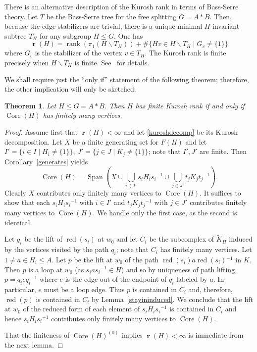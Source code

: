 \documentclass[11pt,reqno]{amsart}
\newtheorem{Thm}{Theorem}
\begin{document}
There is an alternative description of the Kurosh rank in terms of Bass-Serre theory.  Let $T$ be the Bass-Serre tree for the free splitting $G=A\ast B$.  Then, because the edge stabilizers are trivial, there is a unique minimal $H$-invariant subtree $T_H$ for any subgroup $H\leq G$.  One has \[{\mathop{\boldsymbol{r}}}(H)={\mathop{\mathrm{rank}}}(\pi_1(H\backslash T_H))+\#\{Hv\in H\backslash T_H\mid G_v\neq \{1\}\}\] where $G_v$ is the stabilizer of the vertex $v\in T_H$.  The Kurosh rank is finite precisely when $H\backslash T_H$ is finite.  See~\cite{sykiotis} for details.

We shall require just the ``only if'' statement of the following theorem; therefore, the other implication will only be sketched.

\begin{Thm}\label{finitecore}
Let $H\leq G=A\ast B$.  Then $H$ has finite Kurosh rank if and only if ${\mathop{\mathrm{Core}}\nolimits}(H)$ has finitely many vertices.
\end{Thm}
\begin{proof}
Assume first that ${\mathop{\boldsymbol{r}}}(H)<\infty$ and let \eqref{kuroshdecomp} be its Kurosh decomposition. Let $X$ be a finite generating set for $F(H)$ and let $I' = \{i\in I\mid  H_i\neq \{1\}\}$, $J'=\{j\in J\mid  K_j\neq \{1\}\}$; note that $I',J'$ are finite.  Then Corollary~\ref{generates} yields \[{\mathop{\mathrm{Core}}\nolimits}(H)={\mathop{\mathrm{Span}}\nolimits}\left(X\cup \bigcup_{i\in I'}s_iH_is_i{^{-1}}\cup \bigcup_{j\in J'}t_jK_jt_j{^{-1}}\right).\]  Clearly $X$ contributes only finitely many vertices to ${\mathop{\mathrm{Core}}\nolimits}(H)$.  It suffices to show that each $s_iH_is_i{^{-1}}$ with $i\in I'$ and $t_jK_jt_j{^{-1}}$ with $j\in J'$ contributes finitely many vertices to ${\mathop{\mathrm{Core}}\nolimits}(H)$.  We handle only the first case, as the second is identical.

Let $q_i$ be the lift of ${\mathop{\mathrm{red}}\nolimits}(s_i)$ at $w_0$ and let $C_i$ be the subcomplex of ${\ensuremath{\widetilde {K}}}_H$ induced by the vertices visited by the path $q_i$; note that $C_i$ has finitely many vertices.
Let $1\neq a\in H_i\leq A$.  Let $p$ be the lift at $w_0$ of the path ${\mathop{\mathrm{red}}\nolimits}(s_i)a{\mathop{\mathrm{red}}\nolimits}(s_i){^{-1}}$ in $K$.  Then $p$ is a loop at $w_0$ (as $s_ias_i{^{-1}} \in H$) and so by uniqueness of path lifting, $p=q_ieq_i{^{-1}}$ where  $e$ is the edge out of the endpoint of $q_i$ labeled by $a$.  In particular, $e$ must be a loop edge.  Thus $p$ is contained in $C_i$ and, therefore, ${\mathop{\mathrm{red}}\nolimits}(p)$ is contained in $C_i$ by Lemma~\ref{stayininduced}.  We conclude that the lift at $w_0$ of the reduced form of each element of $s_iH_is_i{^{-1}}$ is contained in $C_i$ and hence $s_iH_is_i{^{-1}}$ contributes only finitely many vertices to ${\mathop{\mathrm{Core}}\nolimits}(H)$.

That the finiteness of ${\mathop{\mathrm{Core}}\nolimits}(H)^{(0)}$ implies ${\mathop{\boldsymbol{r}}}(H)<\infty$ is immediate from the next lemma.
\end{proof}
\end{document}
